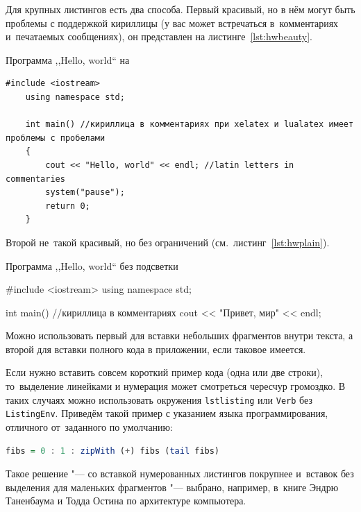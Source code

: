 Для крупных листингов есть два способа. Первый красивый, но в нём могут быть
проблемы с поддержкой кириллицы (у вас может встречаться в~комментариях
и~печатаемых сообщениях), он представлен на листинге~\cref{lst:hwbeauty}.
\begin{ListingEnv}[!h]%
    \captiondelim{ } %
    \caption{Программа ,,Hello, world`` на \protect\cpp}\label{lst:hwbeauty}
    \begin{lstlisting}[language={[ISO]C++}]
	#include <iostream>
	using namespace std;

	int main() //кириллица в комментариях при xelatex и lualatex имеет проблемы с пробелами
	{
		cout << "Hello, world" << endl; //latin letters in commentaries
		system("pause");
		return 0;
	}
    \end{lstlisting}
\end{ListingEnv}%
Второй не~такой красивый, но без ограничений (см.~листинг~\cref{lst:hwplain}).
\begin{ListingEnv}[!h]
    \captiondelim{ } %
    \caption{Программа ,,Hello, world`` без подсветки}\label{lst:hwplain}
    \begin{Verb}

        #include <iostream>
        using namespace std;

        int main() //кириллица в комментариях
        {
            cout << "Привет, мир" << endl;
        }
    \end{Verb}
\end{ListingEnv}

Можно использовать первый для вставки небольших фрагментов
внутри текста, а второй для вставки полного
кода в приложении, если таковое имеется.

Если нужно вставить совсем короткий пример кода (одна или две строки),
то~выделение  линейками и нумерация может смотреться чересчур громоздко.
В таких случаях можно использовать окружения \texttt{lstlisting} или
\texttt{Verb} без \texttt{ListingEnv}. Приведём такой пример
с указанием языка программирования, отличного от~заданного по умолчанию:
\begin{lstlisting}[language=Haskell]
fibs = 0 : 1 : zipWith (+) fibs (tail fibs)
\end{lstlisting}
Такое решение "--- со вставкой нумерованных листингов покрупнее
и~вставок без выделения для маленьких фрагментов "--- выбрано,
например, в~книге Эндрю Таненбаума и Тодда Остина по архитектуре
компьютера.

